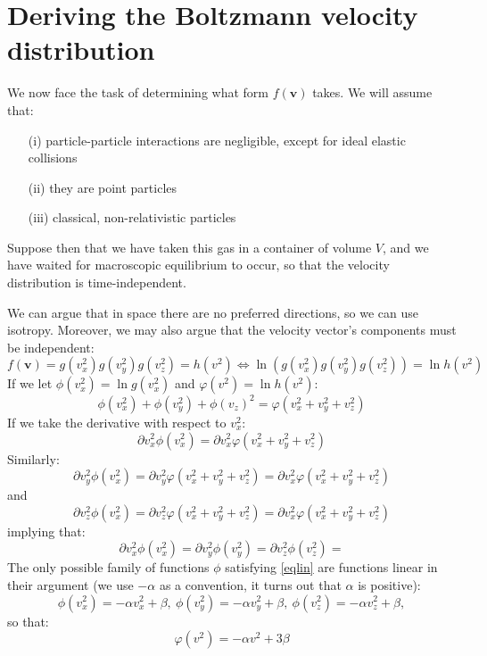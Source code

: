 \documentclass[a4paper,11pt,oneside]{book}
\newcommand{\BF}[1]{\boldsymbol{#1}}
\begin{document}
\section{Deriving the Boltzmann velocity distribution}

We now face the task of determining what form $f(\BF{v})$ takes. We will assume that:
\begin{enumerate}
    \item[(i)] particle-particle interactions are negligible, except for ideal elastic collisions
    \item[(ii)] they are point particles
    \item[(iii)] classical, non-relativistic particles
\end{enumerate}

Suppose then that we have taken this gas in a container of volume $V$, and we have waited for macroscopic equilibrium to occur, so that the velocity distribution is time-independent. 


We can argue that in space there are no preferred directions, so we can use isotropy. Moreover, we may also argue that the velocity vector's components must be independent:
\begin{equation}
    f(\BF{v}) = g(v_x^2)g(v_y^2)g(v_z^2) = h(v^2) \iff \ln (g(v_x^2)g(v_y^2)g(v_z^2) ) = \ln h(v^2)
\end{equation}
If we let $\phi(v_x^2) = \ln g(v_x^2)$ and $\varphi(v^2)=\ln h(v^2)$:
\begin{equation}
    \phi(v_x^2)+\phi(v_y^2)+\phi(v_z)^2 = \varphi(v_x^2+v_y^2+v_z^2)
\end{equation}
If we take the derivative with respect to $v_x^2$:
\begin{equation}
    \partial v_x^2\phi(v_x^2) = \partial v_x^2 \varphi(v_x^2+v_y^2+v_z^2)
\end{equation}
Similarly:
\begin{equation}
    \partial v_y^2\phi(v_x^2) = \partial v_y^2 \varphi(v_x^2+v_y^2+v_z^2)=\partial v_x^2 \varphi(v_x^2+v_y^2+v_z^2)
\end{equation}
and 
\begin{equation}
    \partial v_z^2\phi(v_x^2) = \partial v_z^2 \varphi(v_x^2+v_y^2+v_z^2)=\partial v_x^2 \varphi(v_x^2+v_y^2+v_z^2)
\end{equation}
implying that:
\begin{equation}\label{eqlin}
      \partial v_x^2\phi(v_x^2) =   \partial v_y^2\phi(v_y^2) =  \partial v_z^2\phi(v_z^2) =
\end{equation}
The only possible family of functions $\phi$ satisfying \eqref{eqlin} are functions linear in their argument (we use $-\alpha$ as a convention, it turns out that $\alpha$ is positive):
\begin{equation}
    \phi(v_x^2) = -\alpha v_x^2+\beta,  \ \phi(v_y^2) = -\alpha v_y^2+\beta,  \ \phi(v_z^2) = -\alpha v_z^2+\beta, 
\end{equation}
so that:
\begin{equation}
    \varphi(v^2) = -\alpha v^2 + 3\beta 
\end{equation}
\end{document}
